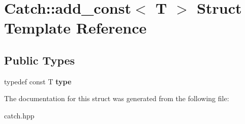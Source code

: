 \hypertarget{structCatch_1_1add__const}{}\section{Catch\+:\+:add\+\_\+const$<$ T $>$ Struct Template Reference}
\label{structCatch_1_1add__const}
\subsection*{Public Types}
\begin{DoxyCompactItemize}
\item 
\mbox{\label{structCatch_1_1add__const_a27941c0ea86767c25ad5094f0c552a8c}} 
typedef const T {\bfseries type}
\end{DoxyCompactItemize}


The documentation for this struct was generated from the following file\+:\begin{DoxyCompactItemize}
\item 
catch.\+hpp\end{DoxyCompactItemize}
